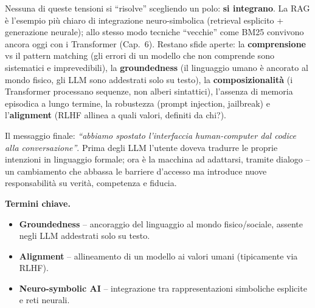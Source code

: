 \documentclass[11pt,a4paper]{article}
\newcommand{\termini}{\medskip\noindent\textbf{\textcolor{blue!45!black}{Termini chiave.}}}
\begin{document}
Nessuna di queste tensioni si ``risolve'' scegliendo un polo: \textbf{si integrano}. La RAG \`e l'esempio pi\`u chiaro di integrazione neuro-simbolica (retrieval esplicito + generazione neurale); allo stesso modo tecniche ``vecchie'' come BM25 convivono ancora oggi con i Transformer (Cap.~6). Restano sfide aperte: la \textbf{comprensione} vs il pattern matching (gli errori di un modello che non comprende sono sistematici e imprevedibili), la \textbf{groundedness} (il linguaggio umano \`e ancorato al mondo fisico, gli LLM sono addestrati solo su testo), la \textbf{composizionalit\`a} (i Transformer processano sequenze, non alberi sintattici), l'assenza di memoria episodica a lungo termine, la robustezza (prompt injection, jailbreak) e l'\textbf{alignment} (RLHF allinea a quali valori, definiti da chi?).

Il messaggio finale: \emph{``abbiamo spostato l'interfaccia human-computer dal codice alla conversazione''}. Prima degli LLM l'utente doveva tradurre le proprie intenzioni in linguaggio formale; ora \`e la macchina ad adattarsi, tramite dialogo -- un cambiamento che abbassa le barriere d'accesso ma introduce nuove responsabilit\`a su verit\`a, competenza e fiducia.

\termini
\begin{itemize}
\item \textbf{Groundedness} -- ancoraggio del linguaggio al mondo fisico/sociale, assente negli LLM addestrati solo su testo.
\item \textbf{Alignment} -- allineamento di un modello ai valori umani (tipicamente via RLHF).
\item \textbf{Neuro-symbolic AI} -- integrazione tra rappresentazioni simboliche esplicite e reti neurali.
\end{itemize}
\end{document}
